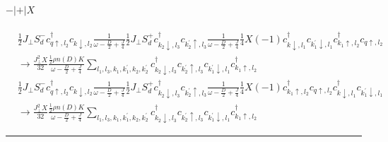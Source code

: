 \documentclass[12pt]{revtex4-2}
\begin{document}
\paragraph{\(-|+|X\)}
\begin{equation}\begin{aligned}
	&\frac{1}{2}J_\perp S_d^- c^\dagger_{q \uparrow, l_2}c_{k \downarrow, l_2} \frac{1}{\omega - \frac{D}{2} + \frac{J}{4}}\frac{1}{2}J_\perp S_d^+ c^\dagger_{k_2 \downarrow, l_3}c_{k_2^\prime \uparrow, l_3} \frac{1}{\omega - \frac{D}{2} + \frac{J}{4}} \frac{1}{4}X \left( -1 \right) c^\dagger_{k \downarrow,l_1}c_{k_1^\prime\downarrow,l_1}c^\dagger_{k_1 \uparrow,l_2}c_{q \uparrow,l_2} \\
	&\longrightarrow \frac{J_\perp^2 X}{32} \frac{\frac{1}{2}\rho n(D) K}{\omega - \frac{D}{2} + \frac{J}{4}}\sum_{l_1, l_3, k_1, k_1^\prime,k_2,k_2^\prime} c^\dagger_{k_2 \downarrow, l_3}c_{k_2^\prime \uparrow, l_3}c_{k_1^\prime\downarrow,l_1}c^\dagger_{k_1 \uparrow,l_2}
\end{aligned}\end{equation}
\begin{equation}\begin{aligned}
	&\frac{1}{2}J_\perp S_d^- c^\dagger_{q \uparrow, l_2}c_{k \downarrow, l_2} \frac{1}{\omega - \frac{D}{2} + \frac{J}{4}}\frac{1}{2}J_\perp S_d^+ c^\dagger_{k_2 \downarrow, l_3}c_{k_2^\prime \uparrow, l_3} \frac{1}{\omega - \frac{D}{2} + \frac{J}{4}} \frac{1}{4}X \left( -1 \right) c^\dagger_{k_1 \uparrow,l_2}c_{q \uparrow,l_2} c^\dagger_{k \downarrow,l_1}c_{k_1^\prime\downarrow,l_1} \\
	&\longrightarrow \frac{J_\perp^2 X}{32} \frac{\frac{1}{2}\rho n(D) K}{\omega - \frac{D}{2} + \frac{J}{4}}\sum_{l_1, l_3, k_1, k_1^\prime,k_2,k_2^\prime} c^\dagger_{k_2 \downarrow, l_3}c_{k_2^\prime \uparrow, l_3}c_{k_1^\prime\downarrow,l_1}c^\dagger_{k_1 \uparrow,l_2}
\end{aligned}\end{equation}

\hrule
\end{document}
